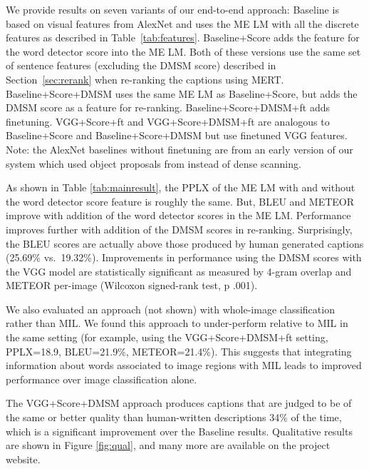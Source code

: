 \documentclass[10pt,twocolumn,letterpaper]{article}
\begin{document}
We provide results on seven variants of our end-to-end approach: Baseline is based on visual features from AlexNet and uses the ME LM with all the discrete features as described in Table~\ref{tab:features}. Baseline+Score adds the feature for the word detector score into the ME LM. Both of these versions use the same set of sentence features (excluding the DMSM score) described in Section~\ref{sec:rerank} when re-ranking the captions using MERT. Baseline+Score+DMSM uses the same ME LM as Baseline+Score, but adds the DMSM score as a feature for re-ranking. Baseline+Score+DMSM+ft adds finetuning. VGG+Score+ft and VGG+Score+DMSM+ft are analogous to Baseline+Score and Baseline+Score+DMSM but use finetuned VGG features. Note: the AlexNet baselines without finetuning are from an early version of our system which used object proposals from \cite{zitnickECCV14} instead of dense scanning.

As shown in Table \ref{tab:mainresult}, the PPLX of the ME LM with and without the word detector score feature is roughly the same. But, BLEU and METEOR improve with addition of the word detector scores in the ME LM. Performance improves further with addition of the DMSM scores in re-ranking. Surprisingly, the BLEU scores are actually above those produced by human generated captions (25.69\% vs.~19.32\%). Improvements in performance using the DMSM scores with the VGG model are statistically significant as measured by 4-gram overlap and METEOR per-image (Wilcoxon signed-rank test, p  .001).

We also evaluated an approach (not shown) with whole-image classification rather than MIL.  We found this approach to under-perform relative to MIL in the same setting (for example, using the VGG+Score+DMSM+ft setting, PPLX=18.9, BLEU=21.9\%, METEOR=21.4\%). This suggests that integrating information about words associated to image regions with MIL leads to improved performance over image classification alone.

The VGG+Score+DMSM approach produces captions that are judged to be of the same or better quality than human-written descriptions 34\% of the time, which is a significant improvement over the Baseline results. Qualitative results are shown in Figure \ref{fig:qual}, and many more are available on the project website.
\end{document}
